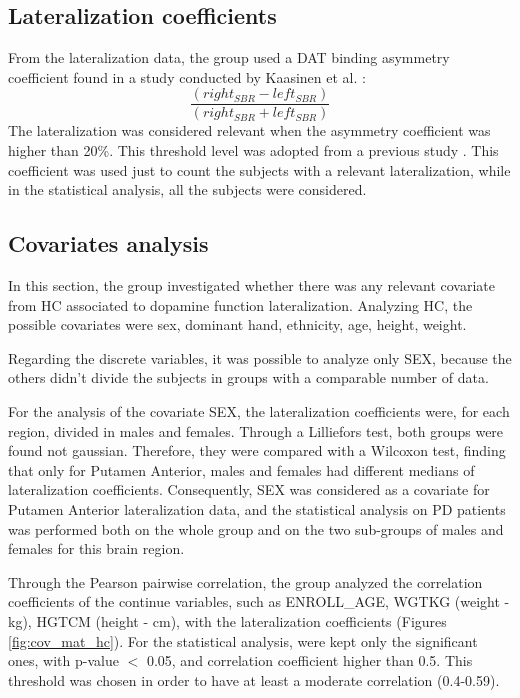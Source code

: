 \documentclass[]{article}
\begin{document}
\begin{multicols}{2}
\subsection{Lateralization coefficients}

From the lateralization data, the group used a DAT binding asymmetry coefficient found in a study conducted by Kaasinen et al. \cite{kaasinen_ipsilateral_2016}: 
\begin{equation}
	\frac{(right_{SBR} - left_{SBR})}{(right_{SBR} + left_{SBR})}
\end{equation}
The lateralization was considered relevant when the asymmetry coefficient was higher than 20\%.
This threshold level was adopted from a previous study \cite{fiorenzato_asymmetric_2021}. 
This coefficient was used just to count the subjects with a relevant lateralization, while in the statistical analysis, all the subjects were considered.

\subsection{Covariates analysis}

In this section, the group investigated whether there was any relevant covariate from HC associated to dopamine function lateralization.
Analyzing HC, the possible covariates were sex, dominant hand, ethnicity, age, height, weight.

Regarding the discrete variables, it was possible to analyze only SEX, because the others didn't divide the subjects in groups with a comparable number of data.

For the analysis of the covariate SEX, the lateralization coefficients were, for each region, divided in males and females. Through a Lilliefors test, both groups were found not gaussian. Therefore, they were compared with a Wilcoxon test, finding that only for Putamen Anterior, males and females had different medians of lateralization coefficients.
Consequently, SEX was considered as a covariate for Putamen Anterior lateralization data, and the statistical analysis on PD patients was performed both on the whole group and on the two sub-groups of males and females for this brain region.

Through the Pearson pairwise correlation, the group analyzed the correlation coefficients of the continue variables, such as ENROLL\_AGE, WGTKG (weight - kg), HGTCM (height - cm), with the lateralization coefficients (Figures \ref{fig:cov_mat_hc}). For the statistical analysis, were kept only the significant ones, with p-value $<$ 0.05, and correlation coefficient higher than 0.5. This threshold was chosen in order to have at least a moderate correlation (0.4-0.59). 


\end{multicols}
\end{document}
